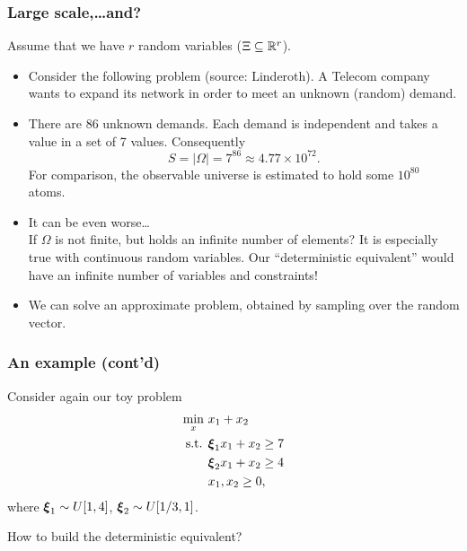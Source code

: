 \documentclass[aspectratio=169]{beamer}
\begin{document}
\begin{frame}
	\frametitle{Large scale,\ldots and?}
	
	Assume that we have $r$ random variables ($\Xi \subseteq
	{\mathbb{R}}^r$).
	\begin{itemize}
		\item
		Consider the following problem (source: Linderoth).
		A Telecom company wants to expand its network in order to meet an unknown (random) demand.
		\item
		There are 86 unknown demands.
		Each demand is independent and takes a value in a set of 7 values.
		Consequently
		\[
		S = |\Omega| = 7^{86} \approx 4.77\times10^{72}.
		\]
		For comparison, the observable universe is estimated to hold some
		$10^{80}$ atoms.
		\item
		It can be even worse\ldots\\
		If $\Omega$ is not finite, but holds an infinite number of elements?
		It is especially true with continuous random variables.
		Our ``deterministic equivalent'' would have an infinite number of variables and constraints!
		\item
		We can solve an approximate problem, obtained by sampling over the random vector.
	\end{itemize}
\end{frame}

\begin{frame}
	\frametitle{An example (cont'd)}
	
	Consider again our toy problem
	\begin{align*}
	\min_x\ & x_1+x_2\\
	\mbox{s.t. } & {\boldsymbol{\xi}}_1x_1 + x_2 \geq 7 \\
	& {\boldsymbol{\xi}}_2x_1 + x_2 \geq 4 \\
	& x_1, x_2 \geq 0,
	\end{align*}
	where ${\boldsymbol{\xi}}_1 \sim U[1,4]$, ${\boldsymbol{\xi}}_2 \sim U[1/3,1]$.
	
	\mbox{}
	
	How to build the deterministic equivalent?
	
\end{frame}
\end{document}

